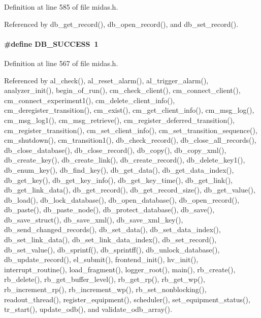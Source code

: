 Definition at line 585 of file midas.h.

Referenced by db\_\-get\_\-record(), db\_\-open\_\-record(), and db\_\-set\_\-record().
\paragraph[{DB\_\-SUCCESS}]{\setlength{\rightskip}{0pt plus 5cm}\#define DB\_\-SUCCESS~1}\hfill\label{group__err23_ga4d6ab4d32144d851ddeb7931b81a63e3}

\begin{DoxyItemize}
\item 
\end{DoxyItemize}

Definition at line 567 of file midas.h.

Referenced by al\_\-check(), al\_\-reset\_\-alarm(), al\_\-trigger\_\-alarm(), analyzer\_\-init(), begin\_\-of\_\-run(), cm\_\-check\_\-client(), cm\_\-connect\_\-client(), cm\_\-connect\_\-experiment1(), cm\_\-delete\_\-client\_\-info(), cm\_\-deregister\_\-transition(), cm\_\-exist(), cm\_\-get\_\-client\_\-info(), cm\_\-msg\_\-log(), cm\_\-msg\_\-log1(), cm\_\-msg\_\-retrieve(), cm\_\-register\_\-deferred\_\-transition(), cm\_\-register\_\-transition(), cm\_\-set\_\-client\_\-info(), cm\_\-set\_\-transition\_\-sequence(), cm\_\-shutdown(), cm\_\-transition1(), db\_\-check\_\-record(), db\_\-close\_\-all\_\-records(), db\_\-close\_\-database(), db\_\-close\_\-record(), db\_\-copy(), db\_\-copy\_\-xml(), db\_\-create\_\-key(), db\_\-create\_\-link(), db\_\-create\_\-record(), db\_\-delete\_\-key1(), db\_\-enum\_\-key(), db\_\-find\_\-key(), db\_\-get\_\-data(), db\_\-get\_\-data\_\-index(), db\_\-get\_\-key(), db\_\-get\_\-key\_\-info(), db\_\-get\_\-key\_\-time(), db\_\-get\_\-link(), db\_\-get\_\-link\_\-data(), db\_\-get\_\-record(), db\_\-get\_\-record\_\-size(), db\_\-get\_\-value(), db\_\-load(), db\_\-lock\_\-database(), db\_\-open\_\-database(), db\_\-open\_\-record(), db\_\-paste(), db\_\-paste\_\-node(), db\_\-protect\_\-database(), db\_\-save(), db\_\-save\_\-struct(), db\_\-save\_\-xml(), db\_\-save\_\-xml\_\-key(), db\_\-send\_\-changed\_\-records(), db\_\-set\_\-data(), db\_\-set\_\-data\_\-index(), db\_\-set\_\-link\_\-data(), db\_\-set\_\-link\_\-data\_\-index(), db\_\-set\_\-record(), db\_\-set\_\-value(), db\_\-sprintf(), db\_\-sprintff(), db\_\-unlock\_\-database(), db\_\-update\_\-record(), el\_\-submit(), frontend\_\-init(), hv\_\-init(), interrupt\_\-routine(), load\_\-fragment(), logger\_\-root(), main(), rb\_\-create(), rb\_\-delete(), rb\_\-get\_\-buffer\_\-level(), rb\_\-get\_\-rp(), rb\_\-get\_\-wp(), rb\_\-increment\_\-rp(), rb\_\-increment\_\-wp(), rb\_\-set\_\-nonblocking(), readout\_\-thread(), register\_\-equipment(), scheduler(), set\_\-equipment\_\-status(), tr\_\-start(), update\_\-odb(), and validate\_\-odb\_\-array().
